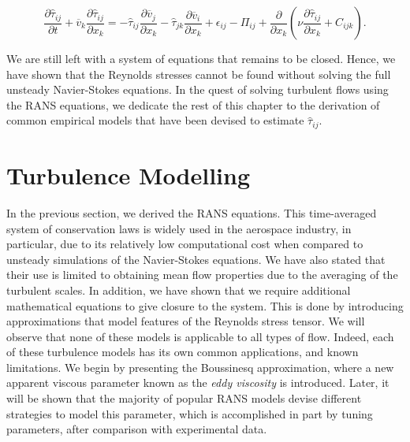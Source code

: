 \begin{eqBox}
	\begin{equation}
		\frac{\partial \hat \tau_{ij}}{\partial t} + \overline v_k \frac{\partial \hat \tau_{ij}}{\partial x_k}
		= - \hat\tau_{ij}\frac{\partial \overline v_j}{\partial x_k} 
		- \hat\tau_{jk}\frac{\partial \overline v_i }{\partial x_k} 
		+ \epsilon_{ij} - \Pi_{ij}
		+ \frac{\partial}{\partial x_k} \left(\nu \frac{\partial \hat\tau_{ij}}{\partial x_k} + C_{ijk}\right).
	\end{equation}
\end{eqBox}
We are still left with a system of equations that remains to be closed. Hence, we have shown that the Reynolds stresses cannot be found without solving the full unsteady Navier-Stokes equations. In the quest of solving turbulent flows using the RANS equations, we dedicate the rest of this chapter to the derivation of common empirical models that have been devised to estimate $\hat \tau_{ij}$.

\section{Turbulence Modelling}
In the previous section, we derived the RANS equations. This time-averaged system of conservation laws is widely used in the aerospace industry, in particular, due to its relatively low computational cost when compared to unsteady simulations of the Navier-Stokes equations. We have also stated that their use is limited to obtaining mean flow properties due to the averaging of the turbulent scales. In addition, we have shown that we require additional mathematical equations to give closure to the system. This is done by introducing approximations that model features of the Reynolds stress tensor.  We will observe that none of these models is applicable to all types of flow. Indeed, each of these turbulence models has its own common applications, and known limitations. We begin by presenting the Boussinesq approximation, where a new apparent viscous parameter known as the \textit{eddy viscosity} is introduced. Later, it will be shown that the majority of popular RANS models devise different strategies to model this parameter, which is accomplished in part by tuning parameters, after comparison with experimental data. 

